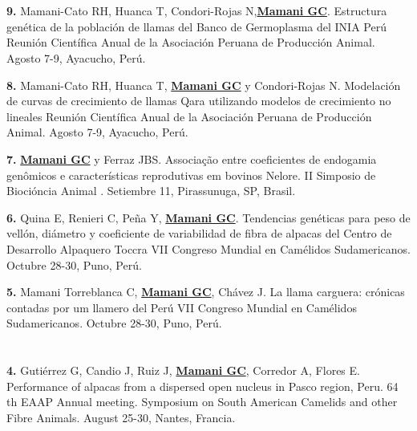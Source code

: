 \documentclass[margin,line,10pt]{res}
\newenvironment{list1}{
  \begin{list}{\ding{113}}{%
      \setlength{\itemsep}{0in}
      \setlength{\parsep}{0in} \setlength{\parskip}{0in}
      \setlength{\topsep}{0in} \setlength{\partopsep}{0in} 
      \setlength{\leftmargin}{0.17in}}}{\end{list}}
\begin{document}
\begin{resume}
\section{}
\begin{list1}
\item [\bf{9}.] Mamani-Cato RH, Huanca T, Condori-Rojas N,{\bf \underline{Mamani GC}}.
Estructura genética de la población de llamas del Banco de Germoplasma del INIA Perú
Reunión Científica Anual de la Asociación Peruana de Producción Animal. Agosto 7-9, Ayacucho, Perú. 
\vspace{0.5cm}

\item [\bf{8}.] Mamani-Cato RH, Huanca T, {\bf \underline{Mamani GC}} y Condori-Rojas N.
Modelación de curvas de crecimiento de llamas Qara utilizando modelos de crecimiento no lineales
Reunión Científica Anual de la Asociación Peruana de Producción Animal. Agosto 7-9, Ayacucho, Perú. 
\vspace{0.5cm}

\item [\bf{7}.] {\bf \underline{Mamani GC}} y Ferraz JBS. 
Associação entre coeficientes de endogamia genômicos e características reprodutivas em bovinos Nelore.
II Simposio de Biocióncia Animal . Setiembre 11, Pirassunuga, SP, Brasil. 
\vspace{0.5cm}

\item [\bf{6}.] Quina E, Renieri C, Peña Y, {\bf \underline{Mamani GC}}.
Tendencias genéticas para peso de vellón, diámetro y coeficiente de variabilidad de fibra de alpacas del Centro de Desarrollo Alpaquero Toccra
VII Congreso Mundial en Camélidos Sudamericanos. Octubre 28-30, Puno, Perú. 
\vspace{0.5cm}

\item [\bf{5}.] Mamani Torreblanca C, {\bf \underline{Mamani GC}}, Chávez J.
La llama carguera: crónicas contadas por um llamero del Perú
VII Congreso Mundial en Camélidos Sudamericanos. Octubre 28-30, Puno, Perú. 
\end{list1}
\vspace{0.5cm}

\section{}
\begin{list1}
\item [\bf{4}.] Gutiérrez G, Candio J, Ruiz J, {\bf \underline{Mamani GC}}, Corredor A, Flores E.
Performance of alpacas from a dispersed open nucleus in Pasco region, Peru.
64 th EAAP Annual meeting. Symposium on South American Camelids and other Fibre Animals. August 25-30, Nantes, Francia. 
\vspace{0.5cm}


\end{list1}
\end{resume}
\end{document}
